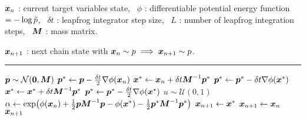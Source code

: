 \begin{algorithmic}
\small
    \Require
    $\boldsymbol{x}_n$ : current target variables state,~
    $\phi$ : differentiable potential energy function $=-\log\tilde{p}$,~
    $\delta t$ : leapfrog integrator step size,~
    $L$ : number of leapfrog integration steps,~
    $\boldsymbol{M}$ : mass matrix.
    \Ensure\raggedright
    $\boldsymbol{x}_{n+1}$ : next chain state with $\boldsymbol{x}_n \sim p \implies \boldsymbol{x}_{n+1} \sim p$.
\end{algorithmic}
\hrule
\small
\begin{algorithmic}[1]
  \State $\vct{p} \sim \nrm{\vct{0}, \mtx{M}}$ 
  \State $\boldsymbol{p}^* \gets \boldsymbol{p} - \frac{\delta t}{2} \nabla\phi(\boldsymbol{x}_n)$ 
  \State $\boldsymbol{x}^* \gets \boldsymbol{x}_n + \delta t \boldsymbol{M}^{-1}\boldsymbol{p}^*$ 
    \State $\boldsymbol{p}^* \gets \boldsymbol{p}^* - \delta t \nabla\phi(\boldsymbol{x}^*)$ 
    \State $\boldsymbol{x}^* \gets \boldsymbol{x}^* + \delta t \boldsymbol{M}^{-1}\boldsymbol{p}^*$ 
  \EndFor
  \State $\boldsymbol{p}^* \gets \boldsymbol{p}^* - \frac{\delta t}{2} \nabla\phi(\boldsymbol{x}^*)$  
  \State $u \sim \mathcal{U}(0,1)$
  \State $\alpha \gets \exp\lpa\phi(\vct{x}_n) + \frac{1}{2}\vct{p}\mtx{M}^{-1}\vct{p} - \phi(\vct{x}^*) - \frac{1}{2}\vct{p}^*\mtx{M}^{-1}\vct{p}^*\rpa$ 
    \State $\boldsymbol{x}_{n+1} \gets \boldsymbol{x}^*$ 
  \Else
    \State $\boldsymbol{x}_{n+1} \gets \boldsymbol{x}_{n}$ 
  \EndIf
  \State \Return $\boldsymbol{x}_{n+1}$
\end{algorithmic}
